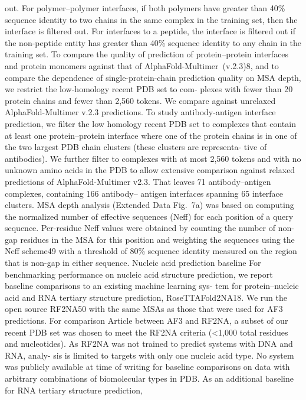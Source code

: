 out. For polymer–polymer interfaces, if both polymers have greater
than 40\% sequence identity to two chains in the same complex in the
training set, then the interface is filtered out. For interfaces to a peptide,
the interface is filtered out if the non-peptide entity has greater than
40\% sequence identity to any chain in the training set.
To compare the quality of prediction of protein–protein interfaces
and protein monomers against that of AlphaFold-Multimer (v.2.3)8, and
to compare the dependence of single-protein-chain prediction quality
on MSA depth, we restrict the low-homology recent PDB set to com-
plexes with fewer than 20 protein chains and fewer than 2,560 tokens.
We compare against unrelaxed AlphaFold-Multimer v.2.3 predictions.
To study antibody-antigen interface prediction, we filter the low
homology recent PDB set to complexes that contain at least one
protein–protein interface where one of the protein chains is in one
of the two largest PDB chain clusters (these clusters are representa-
tive of antibodies). We further filter to complexes with at most 2,560
tokens and with no unknown amino acids in the PDB to allow extensive
comparison against relaxed predictions of AlphaFold-Multimer v2.3.
That leaves 71 antibody–antigen complexes, containing 166 antibody–
antigen interfaces spanning 65 interface clusters.
MSA depth analysis (Extended Data Fig. 7a) was based on computing
the normalized number of effective sequences (Neff) for each position of
a query sequence. Per-residue Neff values were obtained by counting the
number of non-gap residues in the MSA for this position and weighting
the sequences using the Neff scheme49 with a threshold of 80\% sequence
identity measured on the region that is non-gap in either sequence.
Nucleic acid prediction baseline
For benchmarking performance on nucleic acid structure prediction,
we report baseline comparisons to an existing machine learning sys-
tem for protein–nucleic acid and RNA tertiary structure prediction,
RoseTTAFold2NA18. We run the open source RF2NA50 with the same
MSAs as those that were used for AF3 predictions. For comparison
Article
between AF3 and RF2NA, a subset of our recent PDB set was chosen
to meet the RF2NA criteria (<1,000 total residues and nucleotides).
As RF2NA was not trained to predict systems with DNA and RNA, analy-
sis is limited to targets with only one nucleic acid type. No system was
publicly available at time of writing for baseline comparisons on data
with arbitrary combinations of biomolecular types in PDB.
As an additional baseline for RNA tertiary structure prediction,

